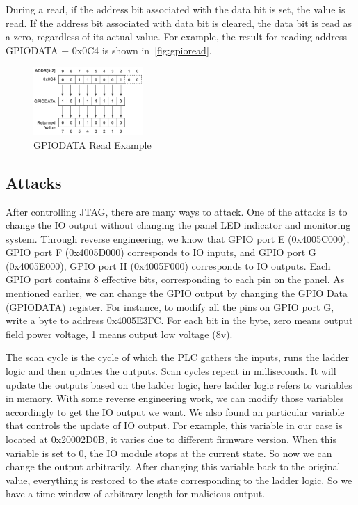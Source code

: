 During a read, if the address bit associated with the data bit is set, the value is read. If the address bit associated with data bit is cleared, the data bit is read as a zero, regardless of its actual value. For example, the result for reading address GPIODATA + 0x0C4 is shown in~\autoref{fig:gpioread}.

\begin{figure}[th]
	\includegraphics[width=0.37\textwidth]{figures/gpioread}
	\centering
	\caption{GPIODATA Read Example~\cite{lm3s2793}}
	\label{fig:gpioread}
\end{figure}



\subsection{Attacks}
After controlling JTAG, there are many ways to attack. One of the attacks is to change the IO output without changing the panel LED indicator and monitoring system. Through reverse engineering, we know that GPIO port E (0x4005C000), GPIO port F (0x4005D000) corresponds to IO inputs, and GPIO port G (0x4005E000), GPIO port H (0x4005F000) corresponds to IO outputs. Each GPIO port contains 8 effective bits, corresponding to each pin on the panel. As mentioned earlier, we can change the GPIO output by changing the GPIO Data (GPIODATA) register. For instance, to modify all the pins on GPIO port G, write a byte to address 0x4005E3FC. For each bit in the byte, zero means output field power voltage, 1 means output low voltage (8v).

The scan cycle is the cycle of which the PLC gathers the inputs, runs the ladder logic and then updates the outputs. Scan cycles repeat in milliseconds. It will update the outputs based on the ladder logic, here ladder logic refers to variables in memory. With some reverse engineering work, we can modify those variables accordingly to get the IO output we want. We also found an particular variable that controls the update of IO output. For example, this variable in our case is located at 0x20002D0B, it varies due to different firmware version. When this variable is set to 0, the IO module stops at the current state. So now we can change the output arbitrarily. After changing this variable back to the original value, everything is restored to the state corresponding to the ladder logic. So we have a time window of arbitrary length for malicious output. 




